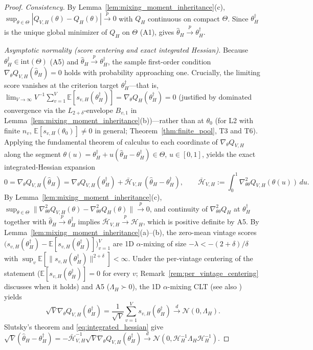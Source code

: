 \begin{proof}
\emph{Consistency.} By Lemma~\ref{lem:mixing_moment_inheritance}(c), $\sup_{\theta\in\Theta}|Q_{V,H}(\theta) - Q_H(\theta)| \xrightarrow{p} 0$ with $Q_H$ continuous on compact $\Theta$. Since $\theta_H^\dagger$ is the unique global minimizer of $Q_H$ on $\Theta$ (A1), \citet[Theorem~2.1]{NM94} gives $\hat\theta_H \xrightarrow{p} \theta_H^\dagger$.

\emph{Asymptotic normality (score centering and exact integrated Hessian).} Because $\theta_H^\dagger \in \mathrm{int}(\Theta)$ (A5) and $\hat\theta_H \xrightarrow{p} \theta_H^\dagger$, the sample first-order condition $\nabla_\theta Q_{V,H}(\hat\theta_H) = 0$ holds with probability approaching one. Crucially, the limiting score vanishes at the criterion target $\theta_H^\dagger$---that is, $\lim_{V\to\infty} V^{-1}\sum_{v=1}^V \mathbb{E}[s_{v,H}(\theta_H^\dagger)] = \nabla_\theta Q_H(\theta_H^\dagger) = 0$ (justified by dominated convergence via the $L_{2+\delta}$-envelope $B_{v,1}$ in Lemma~\ref{lem:mixing_moment_inheritance}(b))---rather than at $\theta_0$ (for L2 with finite $n_v$, $\mathbb{E}[s_{v,H}(\theta_0)] \neq 0$ in general; Theorem~\ref{thm:finite_pool}, T3 and T6). Applying the fundamental theorem of calculus to each coordinate of $\nabla_\theta Q_{V,H}$ along the segment $\theta(u) = \theta_H^\dagger + u(\hat\theta_H - \theta_H^\dagger) \in \Theta$, $u \in [0,1]$, yields the exact integrated-Hessian expansion
\begin{equation}
\label{eq:integrated_hessian}
0 = \nabla_\theta Q_{V,H}(\hat\theta_H)
  = \nabla_\theta Q_{V,H}(\theta_H^\dagger)
  + \bar{\mathcal{H}}_{V,H}\,(\hat\theta_H - \theta_H^\dagger),
\qquad
\bar{\mathcal{H}}_{V,H} := \int_0^1 \nabla_{\theta\theta}^2 Q_{V,H}(\theta(u))\,du.
\end{equation}
By Lemma~\ref{lem:mixing_moment_inheritance}(c), $\sup_{\theta\in\Theta}\|\nabla_{\theta\theta}^2 Q_{V,H}(\theta) - \nabla_{\theta\theta}^2 Q_H(\theta)\| \xrightarrow{p} 0$, and continuity of $\nabla_{\theta\theta}^2 Q_H$ at $\theta_H^\dagger$ together with $\hat\theta_H \xrightarrow{p} \theta_H^\dagger$ implies $\bar{\mathcal{H}}_{V,H} \xrightarrow{p} \mathcal{H}_H$, which is positive definite by A5.
By Lemma~\ref{lem:mixing_moment_inheritance}(a)--(b), the zero-mean vintage scores $\bigl(s_{v,H}(\theta_H^\dagger) - \mathbb{E}[s_{v,H}(\theta_H^\dagger)]\bigr)_{v=1}^V$ are 1D $\alpha$-mixing of size $-\lambda < -(2+\delta)/\delta$ with $\sup_v \mathbb{E}[\|s_{v,H}(\theta_H^\dagger)\|^{2+\delta}] < \infty$. Under the per-vintage centering of the statement ($\mathbb{E}[s_{v,H}(\theta_H^\dagger)] = 0$ for every $v$; Remark~\ref{rem:per_vintage_centering} discusses when it holds) and A5 ($\Lambda_H \succ 0$), the 1D $\alpha$-mixing CLT \citep[Corollary~3.1]{WW88} (see also \citealp[Theorem~24.6]{Davidson94}) yields
\[
\sqrt{V}\nabla_\theta Q_{V,H}(\theta_H^\dagger) = \frac{1}{\sqrt{V}}\sum_{v=1}^V s_{v,H}(\theta_H^\dagger) \xrightarrow{d} \mathcal{N}(0,\Lambda_H).
\]
Slutsky's theorem and \eqref{eq:integrated_hessian} give $\sqrt{V}(\hat\theta_H - \theta_H^\dagger) = -\bar{\mathcal{H}}_{V,H}^{-1}\sqrt{V}\nabla_\theta Q_{V,H}(\theta_H^\dagger) \xrightarrow{d} \mathcal{N}(0,\mathcal{H}_H^{-1}\Lambda_H\mathcal{H}_H^{-1})$.
\end{proof}

